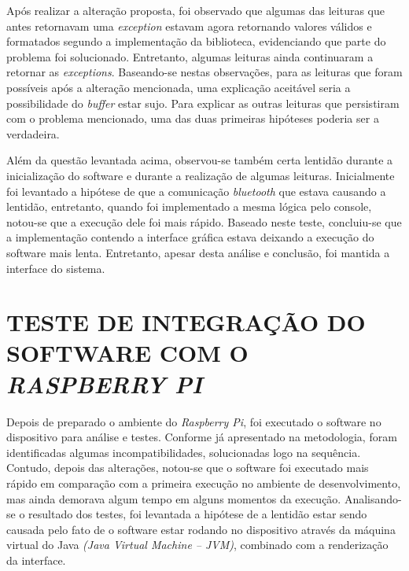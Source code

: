 Após realizar a alteração proposta, foi observado que algumas das leituras que antes retornavam uma \textit{exception} estavam agora retornando valores válidos e formatados segundo a implementação da biblioteca, evidenciando que parte do problema foi solucionado. Entretanto, algumas leituras ainda continuaram a retornar as \textit{exceptions}. Baseando-se nestas observações, para as leituras que foram possíveis após a alteração mencionada, uma explicação aceitável seria a possibilidade do \textit{buffer} estar sujo. Para explicar as outras leituras que persistiram com o problema mencionado, uma das duas primeiras hipóteses poderia ser a verdadeira.

Além da questão levantada acima, observou-se também certa lentidão durante a inicialização do software e durante a realização de algumas leituras. Inicialmente foi levantado a hipótese de que a comunicação \textit{bluetooth} que estava causando a lentidão, entretanto, quando foi implementado a mesma lógica pelo console, notou-se que a execução dele foi mais rápido. Baseado neste teste, concluiu-se que a implementação contendo a interface gráfica estava deixando a execução do software mais lenta. Entretanto, apesar desta análise e conclusão, foi mantida a interface do sistema.

\section{TESTE DE INTEGRAÇÃO DO SOFTWARE COM O \textit{RASPBERRY PI}}
Depois de preparado o ambiente do \textit{Raspberry Pi}, foi executado o software no dispositivo para análise e testes. Conforme já apresentado na metodologia, foram identificadas algumas incompatibilidades, solucionadas logo na sequência. Contudo, depois das alterações, notou-se que o software foi executado mais rápido em comparação com a primeira execução no ambiente de desenvolvimento, mas ainda demorava algum tempo em alguns momentos da execução. Analisando-se o resultado dos testes, foi levantada a hipótese de a lentidão estar sendo causada pelo fato de o software estar rodando no dispositivo através da máquina virtual do Java \textit{(Java Virtual Machine – JVM)}, combinado com a renderização da interface.

